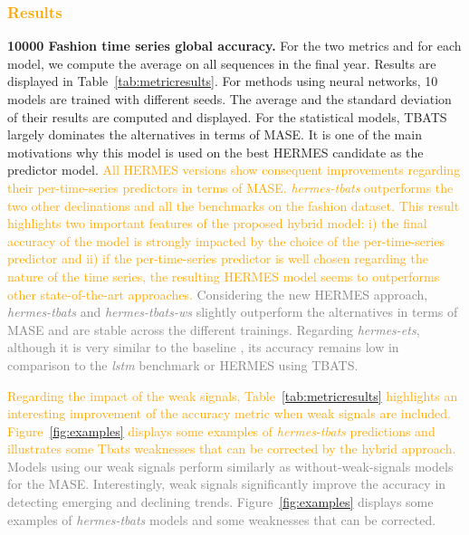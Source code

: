 \documentclass[10pt]{article} %
\begin{document}
\textcolor{orange}{\subsubsection{Results}}

\textbf{10000 Fashion time series global accuracy. }For the two metrics and for each model, we compute the average on all sequences in the final year. Results are displayed in Table~\ref{tab:metricresults}. For methods using neural networks, 10 models are trained  with different seeds. The average and the standard deviation of their results are computed and displayed. For the statistical models, TBATS largely dominates the alternatives in terms of MASE. It is one of the main motivations why this model is used on the best HERMES candidate as the predictor model. \textcolor{orange}{All HERMES versions show consequent improvements regarding their per-time-series predictors in terms of MASE. \textit{hermes-tbats} outperforms the two other declinations and all the benchmarks on the fashion dataset. This result highlights two important features of the proposed hybrid model: i) the final accuracy of the model is strongly impacted by the choice of the per-time-series predictor and ii) if the per-time-series predictor is well chosen regarding the nature of the time series, the resulting HERMES model seems to outperforms other state-of-the-art approaches.}
\textcolor{gray}{Considering the new HERMES approach, \textit{hermes-tbats} and \textit{hermes-tbats-ws} slightly outperform the alternatives in terms of MASE and are stable across the different trainings. Regarding \textit{hermes-ets},   although it is very similar to the baseline \citet{smyl2020}, its accuracy remains low in comparison to the \textit{lstm} benchmark or HERMES using TBATS.}

\textcolor{orange}{Regarding the impact of the weak signals, Table~\ref{tab:metricresults} highlights an interesting improvement of the accuracy metric when weak signals are included. Figure~\ref{fig:examples} displays some examples of \textit{hermes-tbats} predictions and illustrates some Tbats weaknesses that can be corrected by the hybrid approach.}
\textcolor{gray}{
Models using our weak signals perform similarly as without-weak-signals models for the MASE.  Interestingly, weak signals significantly improve the accuracy in detecting emerging and declining trends. Figure~\ref{fig:examples} displays some examples of \textit{hermes-tbats} models and some weaknesses that can be corrected.}
\end{document}
